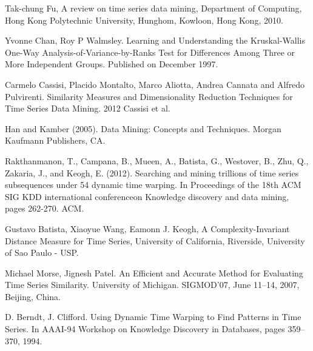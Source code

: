 \begin{thebibliography}{9}
Tak-chung Fu, A review on time series data mining, Department of Computing, Hong Kong Polytechnic University, Hunghom, Kowloon, Hong Kong, 2010.

Yvonne Chan, Roy P Walmsley. Learning and Understanding the Kruskal-Wallis One-Way Analysis-of-Variance-by-Ranks Test for Differences Among Three or More Independent Groups. Published on December 1997.

Carmelo Cassisi, Placido Montalto, Marco Aliotta, Andrea Cannata and Alfredo Pulvirenti. Similarity Measures
and Dimensionality Reduction Techniques for Time Series Data Mining. 2012 Cassisi et al.

Han and Kamber (2005). Data Mining: Concepts and Techniques. Morgan Kaufmann
Publishers, CA.

Rakthanmanon, T., Campana, B., Mueen, A., Batista, G., Westover, B., Zhu, Q., Zakaria, J., and Keogh, E. (2012). Searching and mining trillions of time series subsequences under 54 dynamic time warping. In Proceedings of the 18th ACM SIG KDD international conferenceon Knowledge discovery and data mining, pages 262-270. ACM.

Gustavo Batista, Xiaoyue Wang, Eamonn J. Keogh, A Complexity-Invariant Distance Measure for Time Series, University of California, Riverside, University of Sao Paulo - USP.

Michael Morse, Jignesh Patel. An Efficient and Accurate Method for Evaluating Time Series Similarity. University of Michigan. SIGMOD’07, June 11–14, 2007, Beijing, China.

D. Berndt, J. Clifford. Using Dynamic Time Warping to Find Patterns in Time Series. In AAAI-94 Workshop on Knowledge Discovery in Databases, pages 359–370, 1994.
\end{thebibliography}